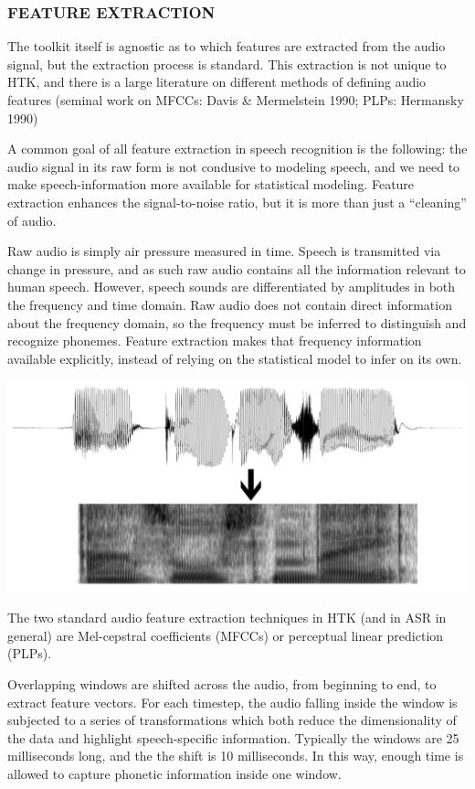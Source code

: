 \documentclass[10pt,a4paper]{article}
\begin{document}
\subsubsection*{FEATURE EXTRACTION}

The toolkit itself is agnostic as to which features are extracted from the audio signal, but the extraction process is standard. This extraction is not unique to HTK, and there is a large literature on different methods of defining audio features (seminal work on MFCCs: Davis \& Mermelstein 1990; PLPs: Hermansky 1990)
  
A common goal of all feature extraction in speech recognition is the following: the audio signal in its raw form is not condusive to modeling speech, and we need to make speech-information more available for statistical modeling. Feature extraction enhances the signal-to-noise ratio, but it is more than just a ``cleaning'' of audio.

Raw audio is simply air pressure measured in time. Speech is transmitted via change in pressure, and as such raw audio contains all the information relevant to human speech. However, speech sounds are differentiated by amplitudes in both the frequency and time domain. Raw audio does not contain direct information about the frequency domain, so the frequency must be inferred to distinguish and recognize phonemes. Feature extraction makes that frequency information available explicitly, instead of relying on the statistical model to infer on its own.

  
\begin{center}
\includegraphics[width=.8\textwidth,keepaspectratio]{figs/spectrogram-waveform.png}
\end{center}



The two standard audio feature extraction techniques in HTK (and in ASR in general) are Mel-cepstral coefficients (MFCCs) or perceptual linear prediction (PLPs).

  Overlapping windows are shifted across the audio, from beginning to end, to extract feature vectors. For each timestep, the audio falling inside the window is subjected to a series of transformations which both reduce the dimensionality of the data and highlight speech-specific information. Typically the windows are 25 milliseconds long, and the the shift is 10 milliseconds. In this way, enough time is allowed to capture phonetic information inside one window.
\end{document}
